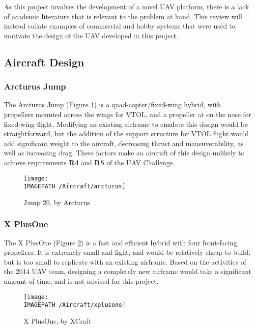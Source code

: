 As this project involves the development of a novel UAV platform, there is a lack of academic literature that is relevant to the problem at hand. This review will instead collate examples of commercial and hobby systems that were used to motivate the design of the UAV developed in this project.\\

\subsection{Aircraft Design}
\label{sec:litaircraft}
\subsubsection*{Arcturus Jump}
The Arcturus Jump\cite{ref:arcturus} (Figure \ref{fig:arcturus}) is a quad-copter/fixed-wing hybrid, with propellers mounted across the wings for VTOL, and a propeller at on the nose for fixed-wing flight. Modifying an existing airframe to emulate this design would be straightforward, but the addition of the support structure for VTOL flight would add significant weight to the aircraft, decreasing thrust and maneuverability, as well as increasing drag. These factors make an aircraft of this design unlikely to achieve requirements \textbf{R4} and \textbf{R5} of the UAV Challenge.

\begin{figure}[!h]
	\centering
	\texttt{[image: \\IMAGEPATH /Aircraft/arcturus]}
	\caption{Jump 20, by Arcturus}
	\label{fig:arcturus}
\end{figure}

\subsubsection*{X PlusOne}
The X PlusOne\cite{ref:xplusone} (Figure \ref{fig:xplusone}) is a fast and efficient hybrid with four front-facing propellers. It is extremely small and light, and would be relatively cheap to build, but is too small to replicate with an existing airframe. Based on the activities of the 2014 UAV team, designing a completely new airframe would take a significant amount of time, and is not advised for this project.

\begin{figure}[!ht]
	\centering
	\texttt{[image: \\IMAGEPATH /Aircraft/xplusone]}
	\caption{X PlusOne, by XCraft}
	\label{fig:xplusone}
\end{figure}

